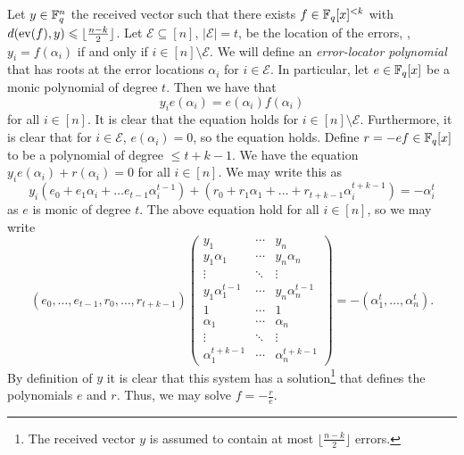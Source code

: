 \documentclass[../main.tex]{subfiles}
\begin{document}
Let $y \in \mathbb{F}_q^n$ the received vector such that there exists $f \in \mathbb{F}_q[x]^{< k}$ with $d(\operatorname{ev}(f), y) \leqslant \lfloor \frac{n - k}{2} \rfloor$. Let $\mathcal{E} \subseteq [n]$, $\lvert \mathcal{E} \rvert = t$, be the location of the errors, \ie, $y_i = f(\alpha_i)$ if and only if $i \in [n] \setminus \mathcal{E}$. We will define an \emph{error-locator polynomial} that has roots at the error locations $\alpha_i$ for $i \in \mathcal{E}$. In particular, let $e \in \mathbb{F}_q[x]$ be a monic polynomial of degree $t$. Then we have that
\begin{equation*}
    y_i e(\alpha_i) = e(\alpha_i)f(\alpha_i)
\end{equation*}
for all $i \in [n]$. It is clear that the equation holds for $i \in [n] \setminus \mathcal{E}$. Furthermore, it is clear that for $i \in \mathcal{E}$, $e(\alpha_i) = 0$, so the equation holds. Define $r = -ef \in \mathbb{F}_q[x]$ to be a polynomial of degree $\leq t + k - 1$. We have the equation $y_i e(\alpha_i) + r(\alpha_i) = 0$ for all $i \in [n]$. We may write this as
\begin{equation*}
    y_i (e_0 + e_1\alpha_i + \dots e_{t - 1} \alpha_i^{t - 1}) + (r_0 + r_1 \alpha_1 + \dots + r_{t + k - 1}\alpha_i^{t + k - 1}) = -\alpha_i^t
\end{equation*}
as $e$ is monic of degree $t$. The above equation hold for all $i \in [n]$, so we may write
\begin{equation*}
    (e_0, \dots, e_{t-1}, r_0, \dots, r_{t + k - 1})\begin{pmatrix}
        y_1 & \cdots & y_n \\
        y_1 \alpha_1 & \cdots & y_n \alpha_n \\
        \vdots & \ddots & \vdots \\
        y_1 \alpha_1^{t-1} & \cdots & y_n \alpha_n^{t-1} \\
        1 & \cdots & 1 \\
        \alpha_1 & \cdots & \alpha_n \\
        \vdots & \ddots & \vdots \\
        \alpha_1^{t + k - 1} & \cdots & \alpha_n^{t + k - 1}
    \end{pmatrix}
    = -(\alpha_1^t, \dots, \alpha_n^t).
\end{equation*}
By definition of $y$ it is clear that this system has a solution\footnote{The received vector $y$ is assumed to contain at most $\lfloor \frac{n - k}{2} \rfloor$ errors.} that defines the polynomials $e$ and $r$. Thus, we may solve $f = -\frac{r}{e}$.
\end{document}
